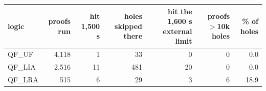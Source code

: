 \begin{tabular}{lrrrrrr}
\toprule
logic & proofs run & hit 1,500 s & holes skipped there & hit the 1,600 s external limit & proofs $>$10k holes & \% of holes \\
\midrule
QF\_UF & 4,118 & 1 & 33 & 0 & 0 & 0.0 \\
QF\_LIA & 2,516 & 11 & 481 & 20 & 0 & 0.0 \\
QF\_LRA & 515 & 6 & 29 & 3 & 6 & 18.9 \\
\bottomrule
\end{tabular}
